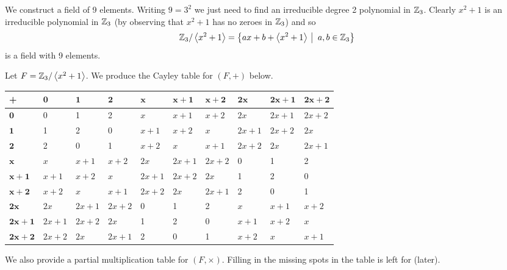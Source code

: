 
\begin{example}
    We construct a field of 9 elements. Writing $9 = 3^2$ we just need to find an irreducible degree 2 polynomial in $\mathbb{Z}_3$. Clearly $x^2 + 1$ is an irreducible polynomial in $\mathbb{Z}_3$ (by observing that $x^2 + 1$ has no zeroes in $\mathbb{Z}_3$) and so
    \[
        \Z_3/\princ{x^2+1} = \left\{ax+b + \princ{x^2+1} \vert a,b \in \Z_3\right\}
    \]
    is a field with 9 elements.

    Let $F = \mathbb{Z}_3/\left\langle x^2+1\right\rangle$. We produce the Cayley table for $(F, +)$ below.
    \begin{table}[H]
        \centering
        \fontsize{9pt}{12pt}\selectfont
        \begin{tabular}{|l|l|l|l|l|l|l|l|l|l|}
            \hline
            \textbf{+} & $\boldsymbol{0}$ & $\boldsymbol{1}$ & $\boldsymbol{2}$ & $\boldsymbol{x}$ & $\boldsymbol{x+1}$ & $\boldsymbol{x+2}$ & $\boldsymbol{2x}$ & $\boldsymbol{2x+1}$ & $\boldsymbol{2x+2}$ \\ \hline
            $\boldsymbol{0}$ & 0 & 1 & 2 & $x$ & $x+1$ & $x+2$ & $2x$ & $2x+1$ & $2x+2$ \\ \hline
            $\boldsymbol{1}$ & 1 & 2 & 0 & $x+1$ & $x+2$ & $x$ & $2x+1$ & $2x+2$ & $2x$ \\ \hline
            $\boldsymbol{2}$ & 2 & 0 & 1 & $x+2$ & $x$ & $x+1$ & $2x+2$ & $2x$ & $2x+1$ \\ \hline
            $\boldsymbol{x}$ & $x$ & $x+1$ & $x+2$ & $2x$ & $2x+1$ & $2x+2$ & 0 & 1 & 2 \\ \hline
            $\boldsymbol{x+1}$ & $x+1$ & $x+2$ & $x$ & $2x+1$ & $2x+2$ & $2x$ & 1 & 2 & 0 \\ \hline
            $\boldsymbol{x+2}$ & $x+2$ & $x$ & $x+1$ & $2x+2$ & $2x$ & $2x+1$ & 2 & 0 & 1 \\ \hline
            $\boldsymbol{2x}$ & $2x$ & $2x+1$ & $2x+2$ & 0 & 1 & 2 & $x$ & $x+1$ & $x+2$ \\ \hline
            $\boldsymbol{2x+1}$ & $2x+1$ & $2x+2$ & $2x$ & 1 & 2 & 0 & $x+1$ & $x+2$ & $x$ \\ \hline
            $\boldsymbol{2x+2}$ & $2x+2$ & $2x$ & $2x+1$ & 2 & 0 & 1 & $x+2$ & $x$ & $x+1$ \\ \hline
        \end{tabular}
    \end{table}

    We also provide a partial multiplication table for $(F, \times)$. Filling in the missing spots in the table is left for  (later).


\end{example}
